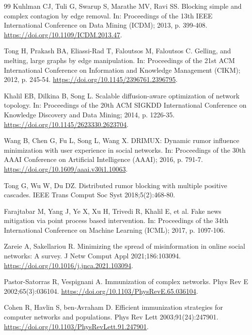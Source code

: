 \documentclass[preprint,11pt]{elsarticle}
\theoremstyle{definition}
\theoremstyle{remark}
\begin{document}
\begin{thebibliography}{99}
Kuhlman CJ, Tuli G, Swarup S, Marathe MV, Ravi SS. Blocking simple and complex contagion by edge removal. In: Proceedings of the 13th IEEE International Conference on Data Mining (ICDM); 2013, p. 399-408. \url{https://doi.org/10.1109/ICDM.2013.47}.

Tong H, Prakash BA, Eliassi-Rad T, Faloutsos M, Faloutsos C. Gelling, and melting, large graphs by edge manipulation. In: Proceedings of the 21st ACM International Conference on Information and Knowledge Management (CIKM); 2012, p. 245-54. \url{https://doi.org/10.1145/2396761.2396795}.

Khalil EB, Dilkina B, Song L. Scalable diffusion-aware optimization of network topology. In: Proceedings of the 20th ACM SIGKDD International Conference on Knowledge Discovery and Data Mining; 2014, p. 1226-35. \url{https://doi.org/10.1145/2623330.2623704}.

Wang B, Chen G, Fu L, Song L, Wang X. DRIMUX: Dynamic rumor influence minimization with user experience in social networks. In: Proceedings of the 30th AAAI Conference on Artificial Intelligence (AAAI); 2016, p. 791-7. \url{https://doi.org/10.1609/aaai.v30i1.10063}.

Tong G, Wu W, Du DZ. Distributed rumor blocking with multiple positive cascades. IEEE Trans Comput Soc Syst 2018;5(2):468-80.

Farajtabar M, Yang J, Ye X, Xu H, Trivedi R, Khalil E, et al. Fake news mitigation via point process based intervention. In: Proceedings of the 34th International Conference on Machine Learning (ICML); 2017, p. 1097-106.

Zareie A, Sakellariou R. Minimizing the spread of misinformation in online social networks: A survey. J Netw Comput Appl 2021;186:103094. \url{https://doi.org/10.1016/j.jnca.2021.103094}.

Pastor-Satorras R, Vespignani A. Immunization of complex networks. Phys Rev E 2002;65(3):036104. \url{https://doi.org/10.1103/PhysRevE.65.036104}.

Cohen R, Havlin S, ben-Avraham D. Efficient immunization strategies for computer networks and populations. Phys Rev Lett 2003;91(24):247901. \url{https://doi.org/10.1103/PhysRevLett.91.247901}.


\end{thebibliography}
\end{document}

